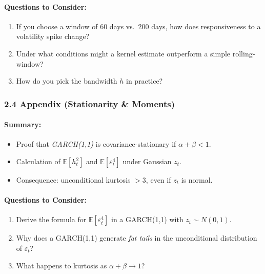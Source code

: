 \documentclass[11pt]{amsart}
\begin{document}
\paragraph{Questions to Consider:}
\begin{enumerate}[noitemsep,left=0pt]
	\item If you choose a window of 60 days vs.\ 200 days, how does responsiveness to a volatility spike change?
	\item Under what conditions might a kernel estimate outperform a simple rolling‐window?
	\item How do you pick the bandwidth $h$ in practice?
\end{enumerate}

\subsubsection{2.4 Appendix (Stationarity \& Moments)}
\paragraph{Summary:}
\begin{itemize}[noitemsep,left=0pt]
	\item Proof that \emph{GARCH(1,1)} is covariance‐stationary if $\alpha + \beta < 1$.
	\item Calculation of $\mathbb{E}[h_t^2]$ and $\mathbb{E}[\varepsilon_t^4]$ under Gaussian $z_t$.
	\item Consequence: unconditional kurtosis $> 3$, even if $z_t$ is normal.
\end{itemize}

\paragraph{Questions to Consider:}
\begin{enumerate}[noitemsep,left=0pt]
	\item Derive the formula for $\mathbb{E}[\varepsilon_t^4]$ in a GARCH(1,1) with $z_t \sim N(0,1)$.
	\item Why does a GARCH(1,1) generate \emph{fat tails} in the unconditional distribution of $\varepsilon_t$?
	\item What happens to kurtosis as $\alpha + \beta \to 1$?
\end{enumerate}
\end{document}
